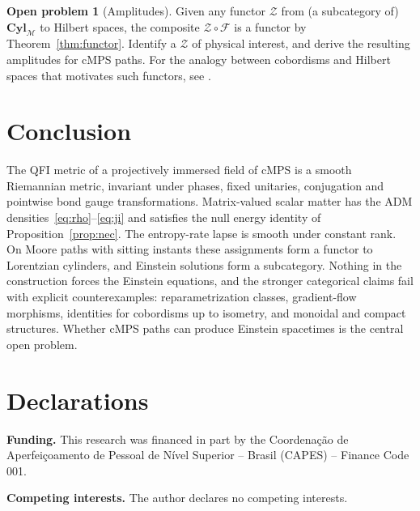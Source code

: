 \documentclass[11pt,a4paper,reqno]{amsart}
\theoremstyle{definition}
\newtheorem{problem}[theorem]{Open problem}
\numberwithin{equation}{section}
\newcommand{\Cyl}{\mathbf{Cyl}_{\mathcal{M}}}
\begin{document}
\begin{problem}[Amplitudes]
Given any functor $\mathcal{Z}$ from (a subcategory of) $\Cyl$ to Hilbert spaces, the composite $\mathcal{Z}\circ\mathcal{F}$ is a functor by Theorem~\ref{thm:functor}. Identify a $\mathcal{Z}$ of physical interest, and derive the resulting amplitudes for cMPS paths. For the analogy between cobordisms and Hilbert spaces that motivates such functors, see \cite{baez2006quandaries}.
\end{problem}

\section{Conclusion}
\label{sec:conclusion}

The QFI metric of a projectively immersed field of cMPS is a smooth Riemannian metric, invariant under phases, fixed unitaries, conjugation and pointwise bond gauge transformations. Matrix-valued scalar matter has the ADM densities~\eqref{eq:rho}--\eqref{eq:ji} and satisfies the null energy identity of Proposition~\ref{prop:nec}. The entropy-rate lapse is smooth under constant rank. On Moore paths with sitting instants these assignments form a functor to Lorentzian cylinders, and Einstein solutions form a subcategory. Nothing in the construction forces the Einstein equations, and the stronger categorical claims fail with explicit counterexamples: reparametrization classes, gradient-flow morphisms, identities for cobordisms up to isometry, and monoidal and compact structures. Whether cMPS paths can produce Einstein spacetimes is the central open problem.

\section*{Declarations}

\noindent\textbf{Funding.} This research was financed in part by the
Coordena\c{c}\~ao de Aperfei\c{c}oamento de Pessoal de N\'ivel Superior -- Brasil
(CAPES) -- Finance Code 001.

\medskip\noindent\textbf{Competing interests.} The author declares no competing
interests.
\end{document}

